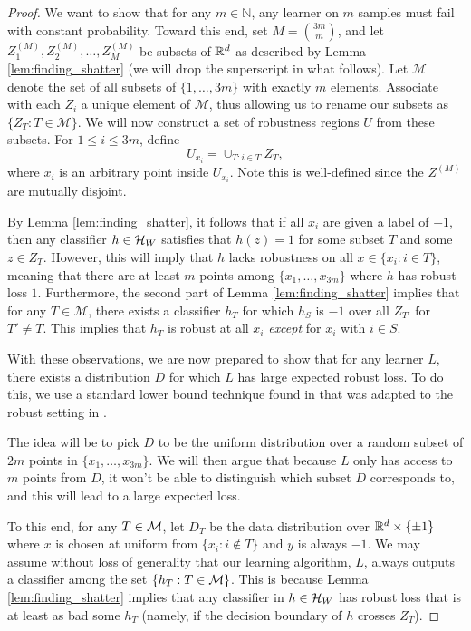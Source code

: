\begin{proof}
We want to show that for any $m \in \mathbb{N}$, any learner on $m$ samples must fail with constant probability. Toward this end, set $M = \binom{3m}{m}$, and let $Z^{(M)}_1, Z^{(M)}_2, \dots, Z^{(M)}_M$ be subsets of $\mathbb{R}^d$ as described by Lemma \ref{lem:finding_shatter} (we will drop the superscript in what follows). Let $\mathcal{M}$ denote the set of all subsets of $\{1, \dots, 3m\}$ with exactly $m$ elements. Associate with each $Z_i$ a unique element of $\mathcal{M}$, thus allowing us to rename our subsets as $\{Z_T: T \in \mathcal{M}\}.$ We will now construct a set of robustness regions $U$ from these subsets. For $1 \leq i \leq 3m$, define $$U_{x_i} = \cup_{T: i \in T} Z_T,$$ where $x_i$ is an arbitrary point inside $U_{x_i}$. Note this is well-defined since the $Z^{(M)}$ are mutually disjoint.

By Lemma \ref{lem:finding_shatter}, it follows that if all $x_i$ are given a label of $-1$, then any classifier $h \in \mathcal H_W$ satisfies that $h(z) = 1$ for some subset $T$ and some $z \in Z_T$. However, this will imply that $h$ lacks robustness on all $x \in \{x_i: i \in T\}$, meaning that there are at least $m$ points among $\{x_1, \dots, x_{3m}\}$ where $h$ has robust loss $1$. Furthermore, the second part of Lemma \ref{lem:finding_shatter} implies that for any $T \in \mathcal{M}$, there exists a classifier $h_T$ for which $h_S$ is $-1$ over all $Z_{T'}$ for $T' \neq T$. This implies that $h_T$ is robust at all $x_i$ \textit{except} for $x_i$ with $i \in S$. 

With these observations, we are now prepared to show that for any learner $L$, there exists a distribution $D$ for which $L$ has large expected robust loss. To do this, we use a standard lower bound technique found in \cite{ml_book} that was adapted to the robust setting in \cite{Srebro19}.

 The idea will be to pick $D$ to be the uniform distribution over a random subset of $2m$ points in $\{x_1, \dots, x_{3m}\}$. We will then argue that because $L$ only has access to $m$ points from $D$, it won't be able to distinguish which subset $D$ corresponds to, and this will lead to a large expected loss.

To this end, for any $T \in \mathcal M$, let $D_T$ be the data distribution over $\mathbb{R}^d \times \{\pm 1\}$ where $x$ is chosen at uniform from $\{x_i: i \notin T\}$ and $y$ is always $-1$. We may assume without loss of generality that our learning algorithm, $L$, always outputs a classifier among the set $\{h_T: T \in \mathcal M\}$. This is because Lemma \ref{lem:finding_shatter} implies that any classifier in $h \in \mathcal H_W$ has robust loss that is at least as bad some $h_T$ (namely, if the decision boundary of $h$ crosses $Z_T$). 


\end{proof}
